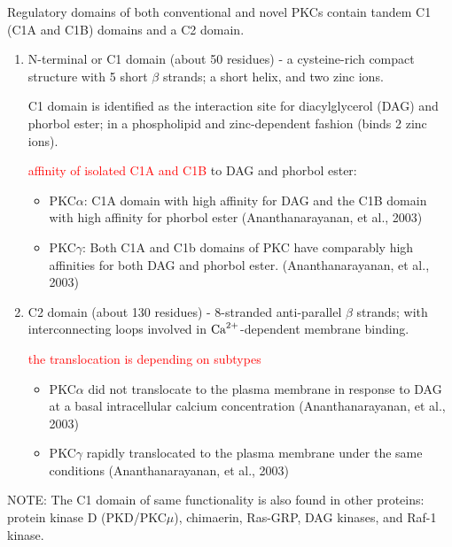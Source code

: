 Regulatory domains of both conventional and novel PKCs contain tandem C1 (C1A
and C1B) domains and a C2 domain. 
\begin{enumerate}
  \item N-terminal or C1 domain (about 50 residues) - a cysteine-rich compact
  structure with 5 short $\beta$ strands; a short helix, and two zinc ions.
  
  C1 domain is identified as the interaction site for diacylglycerol (DAG)
  and phorbol ester; in a phospholipid and zinc-dependent fashion (binds 2 zinc
  ions).
   
 \textcolor{red}{affinity of isolated C1A and C1B} to DAG and phorbol ester:
 \begin{itemize}
   \item PKC$\alpha$: C1A domain with high affinity for DAG and the C1B
domain with high affinity for phorbol ester (Ananthanarayanan, et al., 2003)
   
   \item PKC$\gamma$: Both C1A and C1b domains of PKC have comparably high
   affinities for both DAG and phorbol ester. (Ananthanarayanan, et al., 2003)
    
 \end{itemize}

  \item C2 domain (about 130 residues) - 8-stranded anti-parallel $\beta$
  strands; with interconnecting loops involved in ${\text{Ca}^{2+}}$-dependent membrane
  binding.

  \textcolor{red}{the translocation is depending on subtypes}
  \begin{itemize}
    \item  PKC$\alpha$ did not translocate to the plasma membrane in response to
    DAG at a basal intracellular calcium concentration (Ananthanarayanan, et
    al., 2003)
     
    \item PKC$\gamma$ rapidly translocated to the plasma membrane under the same
    conditions  (Ananthanarayanan, et al., 2003)
  \end{itemize}
\end{enumerate}

\begin{mdframed}
NOTE: The C1 domain of same functionality is also found in other
proteins: protein kinase D (PKD/PKC$\mu$), chimaerin, Ras-GRP, DAG kinases, and
Raf-1 kinase.
\end{mdframed}

